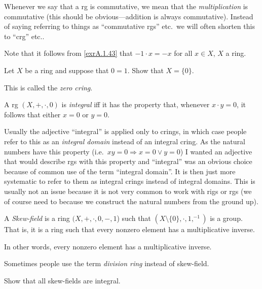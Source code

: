 \begin{rmk}
Whenever we say that a rg is commutative, we mean that the \emph{multiplication} is commutative (this should be obvious---addition is always commutative).  Instead of saying referring to things as ``commutative rgs'' etc.~we will often shorten this to ``crg'' etc..
\end{rmk}
\begin{rmk}
Note that it follows from \cref{exrA.1.43} that $-1\cdot x=-x$ for all $x\in X$, $X$ a ring.
\end{rmk}
\begin{exr}
Let $X$ be a ring and suppose that $0=1$.  Show that $X=\{ 0\}$.
\begin{rmk}
This is called the \emph{zero cring}.
\end{rmk}
\end{exr}
\begin{dfn}[Integral]\label{dfnA.1.69}
A rg $(X,+,\cdot ,0)$ is \emph{integral} iff it has the property that, whenever $x\cdot y=0$, it follows that either $x=0$ or $y=0$.
\begin{rmk}
Usually the adjective ``integral'' is applied only to crings, in which case people refer to this as an \emph{integral domain} instead of an integral cring.  As the natural numbers have this property (i.e.~$xy=0\Rightarrow x=0\vee y=0$) I wanted an adjective that would describe rgs with this property and ``integral'' was an obvious choice because of common use of the term ``integral domain''.  It is then just more systematic to refer to them as integral crings instead of integral domains.  This is usually not an issue because it is not very common to work with rigs or rgs (we of course need to because we construct the natural numbers from the ground up).
\end{rmk}
\end{dfn}
\begin{dfn}
A \emph{Skew-field} is a ring $(X,+,\cdot ,0,-,1$) such that $(X\setminus \{ 0\} ,\cdot ,1,^{-1})$ is a group.  That is, it is a ring such that every nonzero element has a multiplicative inverse.
\begin{rmk}
In other words, every nonzero element has a multiplicative inverse.
\end{rmk}
\begin{rmk}
Sometimes people use the term \emph{division ring} instead of skew-field.
\end{rmk}
\begin{exr}
Show that all skew-fields are integral.
\end{exr}
\end{dfn}
